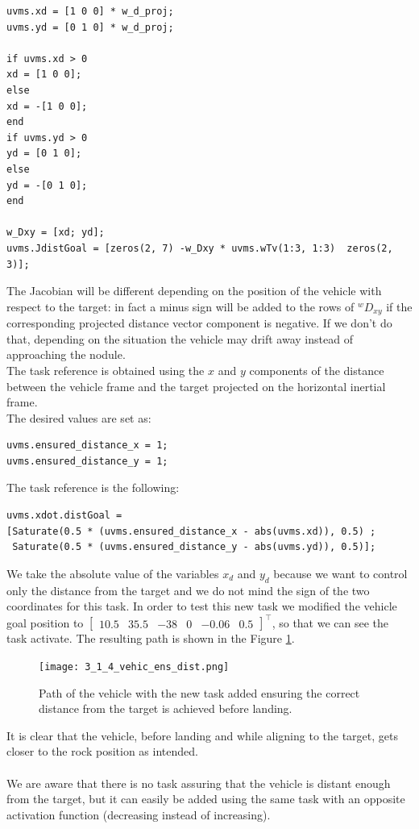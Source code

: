 \documentclass{article}
\begin{document}
\begin{lstlisting}
uvms.xd = [1 0 0] * w_d_proj;
uvms.yd = [0 1 0] * w_d_proj;

if uvms.xd > 0
xd = [1 0 0];
else
xd = -[1 0 0];
end
if uvms.yd > 0
yd = [0 1 0];
else
yd = -[0 1 0];
end

w_Dxy = [xd; yd];
uvms.JdistGoal = [zeros(2, 7) -w_Dxy * uvms.wTv(1:3, 1:3)  zeros(2, 3)];
\end{lstlisting}
The Jacobian will be different depending on the position of the vehicle with respect to the target: in fact a minus sign will be added to the rows of \(^wD_{xy}\) if the corresponding projected distance vector component is negative. If we don't do that, depending on the situation the vehicle may drift away instead of approaching the nodule.\\
The task reference is obtained using the \(x\) and \(y\) components of the distance between the vehicle frame and the target projected on the horizontal inertial frame.\\
The desired values are set as: 
\begin{lstlisting}
uvms.ensured_distance_x = 1;
uvms.ensured_distance_y = 1;
\end{lstlisting}
The task reference is the following: 
\begin{lstlisting}
uvms.xdot.distGoal = 
[Saturate(0.5 * (uvms.ensured_distance_x - abs(uvms.xd)), 0.5) ;
 Saturate(0.5 * (uvms.ensured_distance_y - abs(uvms.yd)), 0.5)];
\end{lstlisting}
We take the absolute value of the variables \(x_d\) and \(y_d\) because we want to control only the distance from the target and we do not mind the sign of the two coordinates for this task.
In order to test this new task we modified the vehicle goal position to \(\begin{bmatrix} 10.5 & 35.5 & -38 & 0 & -0.06 & 0.5 \end{bmatrix}^\top\), so that we can see the task activate. The resulting path is shown in the Figure \ref{im:v_land_ens_dist}.
\begin{figure}[H]
	\centering
	{\texttt{[image: 3\_1\_4\_vehic\_ens\_dist.png]}}
	\caption{Path of the vehicle with the new task added ensuring the correct distance from the target is achieved before landing. }
	\label{im:v_land_ens_dist}
\end{figure} 
It is clear that the vehicle, before landing and while aligning to the target, gets closer to the rock position as intended.\\\\
We are aware that there is no task assuring that the vehicle is distant enough from the target, but it can easily be added using the same task with an opposite activation function (decreasing instead of increasing). 
\clearpage
\end{document}
